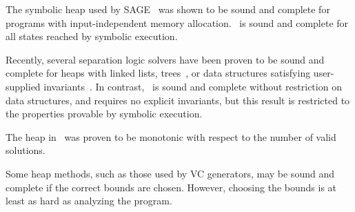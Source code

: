 %
The symbolic heap used by SAGE~\cite{Elkarablieh:2009} was shown to be sound and complete for programs with input-independent memory allocation.~\symtxt{} is sound and complete for all states reached by symbolic execution. 

Recently, several separation logic solvers have been proven to be sound and complete for heaps with linked lists, trees~\cite{Piskac:2014}, or data structures satisfying user-supplied invariants~\cite{Brotherston:2014}. In contrast,~\symtxt{} is sound and complete without restriction on data structures, and requires no explicit invariants, but this result is restricted to the properties provable by symbolic execution. 

The heap in~\cite{Dillig:2011} was proven to be monotonic with respect to the number of valid solutions. 

Some heap methods, such as those used by VC generators, may be sound and complete if the correct bounds are chosen. However, choosing the bounds is at least as hard as analyzing the program. 






%
%
%

%
%
%
%
%
